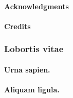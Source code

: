 




\frontmatter

\renewcommand{\hbTitle}{Placeholder Title \protect\\ That is kind of long}
\renewcommand{\hbSubtitle}{Created by Artefact2, typeset with \XeTeX \protect\\ \url{https://github.com/Artefact2/texbrew/}}
\renewcommand*{\hbCoverFile}{assets/samples/cover}
\hbMakecover

\renewcommand*{\hbSubcoverFile}{assets/samples/cover2}
\hbMakesubcover

\paragraph*{Acknowledgments} {\footnotesize \lipsum[100-101]}

\paragraph*{Credits}

{\footnotesize
\begin{itemize}

\end{itemize}}

\clearpage
\tableofcontents*

\mainmatter


 \lipsum[104-108]

\begin{phNote}
\subsubsection*{Lobortis vitae}
\paragraph*{Urna sapien.} \lipsum[2]
\paragraph*{Aliquam ligula.} \lipsum[3]
\end{phNote}

